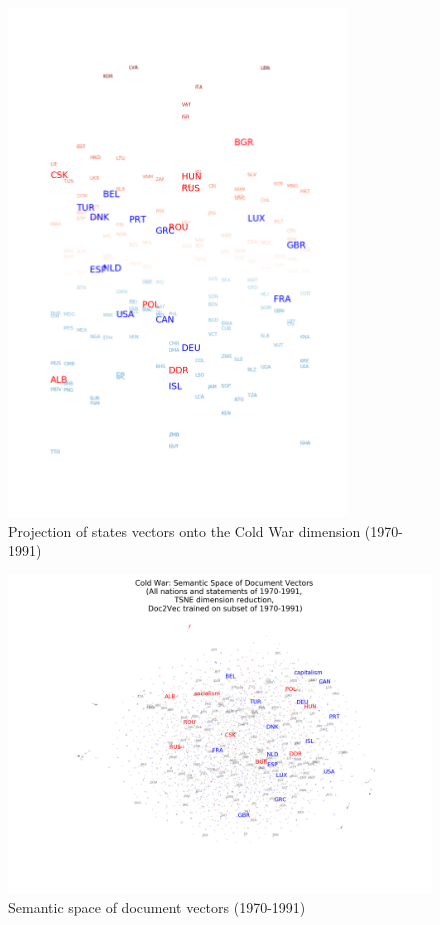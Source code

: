 \documentclass[final,authoryear,3p,12pt,times,hidelinks]{elsarticle}
\begin{document}
\begin{figure}[ht!]
  \begin{center}
    \includegraphics[width=0.8\textwidth]{graphs/doc2vec_projection_coldwar.png}
    \caption{Projection of states vectors onto the Cold War dimension (1970-1991)}
    \label{fig:doc2vec projection cold war}
  \end{center}
\end{figure}

\begin{figure}[ht!]
  \begin{center}
    \includegraphics[width=\textwidth]{graphs/doc2vec_semantic_space_cold_war.png}
    \caption{Semantic space of document vectors (1970-1991)}
    \label{fig:doc2vec semantic space cold war}
  \end{center}
\end{figure}
\end{document}
